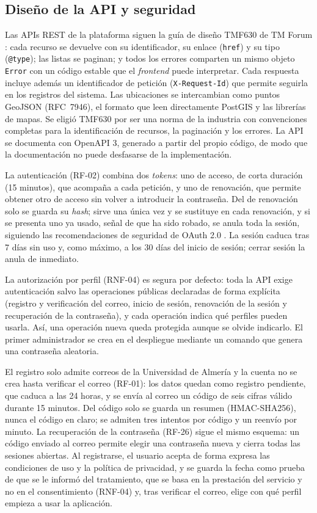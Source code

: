 \subsection{Diseño de la API y seguridad}
\label{sec:api-seguridad}

Las APIs REST de la plataforma siguen la guía de diseño TMF630 de TM Forum \cite{TMF630}: cada recurso se devuelve con su identificador, su enlace (\texttt{href}) y su tipo (\texttt{@type}); las listas se paginan; y todos los errores comparten un mismo objeto \texttt{Error} con un código estable que el \textit{frontend} puede interpretar. Cada respuesta incluye además un identificador de petición (\texttt{X-Request-Id}) que permite seguirla en los registros del sistema. Las ubicaciones se intercambian como puntos GeoJSON (RFC~7946), el formato que leen directamente PostGIS y las librerías de mapas. Se eligió TMF630 por ser una norma de la industria con convenciones completas para la identificación de recursos, la paginación y los errores. La API se documenta con OpenAPI 3, generado a partir del propio código, de modo que la documentación no puede desfasarse de la implementación.

La autenticación (RF-02) combina dos \textit{tokens}: uno de acceso, de corta duración (15 minutos), que acompaña a cada petición, y uno de renovación, que permite obtener otro de acceso sin volver a introducir la contraseña. Del de renovación solo se guarda su \textit{hash}; sirve una única vez y se sustituye en cada renovación, y si se presenta uno ya usado, señal de que ha sido robado, se anula toda la sesión, siguiendo las recomendaciones de seguridad de OAuth 2.0 \cite{RFC9700}. La sesión caduca tras 7 días sin uso y, como máximo, a los 30 días del inicio de sesión; cerrar sesión la anula de inmediato.

La autorización por perfil (RNF-04) es segura por defecto: toda la API exige autenticación salvo las operaciones públicas declaradas de forma explícita (registro y verificación del correo, inicio de sesión, renovación de la sesión y recuperación de la contraseña), y cada operación indica qué perfiles pueden usarla. Así, una operación nueva queda protegida aunque se olvide indicarlo. El primer administrador se crea en el despliegue mediante un comando que genera una contraseña aleatoria.

El registro solo admite correos de la Universidad de Almería y la cuenta no se crea hasta verificar el correo (RF-01): los datos quedan como registro pendiente, que caduca a las 24 horas, y se envía al correo un código de seis cifras válido durante 15 minutos. Del código solo se guarda un resumen (HMAC-SHA256), nunca el código en claro; se admiten tres intentos por código y un reenvío por minuto. La recuperación de la contraseña (RF-26) sigue el mismo esquema: un código enviado al correo permite elegir una contraseña nueva y cierra todas las sesiones abiertas. Al registrarse, el usuario acepta de forma expresa las condiciones de uso y la política de privacidad, y se guarda la fecha como prueba de que se le informó del tratamiento, que se basa en la prestación del servicio y no en el consentimiento (RNF-04) y, tras verificar el correo, elige con qué perfil empieza a usar la aplicación.

